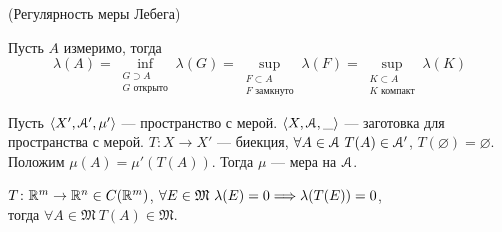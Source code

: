 \begin{corollary}(Регулярность меры Лебега)

    Пусть $A$ измеримо, тогда
\[
    \lambda(A) = \inf_{\substack{G \supset A \\ G \text{ открыто}}}{\lambda(G)}
    = \sup_{\substack{F \subset A \\ F \text{ замкнуто}}}{\lambda(F)}
    = \sup_{\substack{K \subset A \\ K \text{ компакт}}}{\lambda(K)}
\]
\end{corollary}

\begin{lemma}

    Пусть $\langle X', \mathcal{A}', \mu' \rangle$ --- пространство с мерой.
    $\langle X, \mathcal{A}, \_ \rangle$ --- заготовка для пространства с мерой.
    $T \colon X \to X'$ --- биекция, $\forall A \in \mathcal{A}~ T(A) \in \mathcal{A}'$,
    $T(\varnothing) = \varnothing$. Положим $\mu(A) = \mu'(T(A))$. Тогда
    $\mu$ --- мера на $\mathcal{A}$.
\end{lemma}

\begin{lemma}
    $T \colon \mathbb{R}^m \to \mathbb{R}^n \in C(\mathbb{R}^m)$, $\forall E \in \mathfrak{M}~ \lambda(E) = 0
    \Longrightarrow \lambda(T(E)) = 0$, \\ тогда $\forall A \in \mathfrak{M}~ T(A) \in \mathfrak{M}$.
\end{lemma}

\let\x\undefined
\let\y\undefined
\let\h\undefined
\let\w\undefined
\let\z\undefined
\let\Od\undefined
\let\N\undefined
\let\C\undefined
